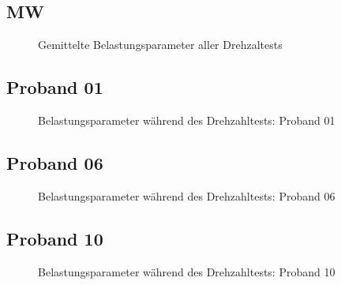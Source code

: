 \documentclass[
  letterpaper,
  DIV=11]{scrartcl}
\begin{document}
\subsection{MW}

\begin{figure}


\caption{\label{fig-DT_gemittelt}Gemittelte Belastungsparameter aller
Drehzaltests}

\end{figure}%

\subsection{Proband 01}

\begin{figure}


\caption{\label{fig-DT_1}Belastungsparameter während des Drehzahltests:
Proband 01}

\end{figure}%

\subsection{Proband 06}

\begin{figure}


\caption{\label{fig-DT_6}Belastungsparameter während des Drehzahltests:
Proband 06}

\end{figure}%

\subsection{Proband 10}

\begin{figure}


\caption{\label{fig-DT_10}Belastungsparameter während des Drehzahltests:
Proband 10}

\end{figure}%
\end{document}
